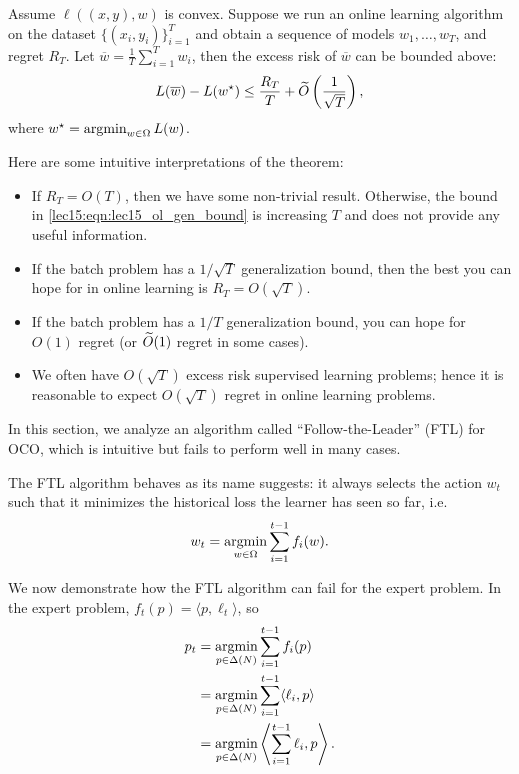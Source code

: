 \begin{theorem}
Assume $\ell((x, y), w)$ is convex. Suppose we run an online learning algorithm on the dataset $\{(x_i, y_i)\}_{i=1}^T$ and obtain a sequence of models $w_1, \dots, w_T$, and regret $R_T$. Let $\overline{w} = \frac{1}{T} \sum_{i=1}^T w_i$, then the excess risk of $\overline{w}$ can be bounded above:
\begin{align}
L(\overline{w}) - L(w^\star) \leq \frac{R_T}{T} + \widetilde{O}\left(\frac{1}{\sqrt{T}}\right), \label{lec15:eqn:lec15_ol_gen_bound}
\end{align}
where $w^\star = \operatorname*{\textup{argmin}}_{w \in \Omega} L(w)$.
\end{theorem}

Here are some intuitive interpretations of the theorem:

    \begin{itemize}
        \item If $R_T = O(T)$, then we have some non-trivial result. Otherwise, the bound in \eqref{lec15:eqn:lec15_ol_gen_bound} is increasing $T$ and does not provide any useful information.
        \item If the batch problem has a $1 / \sqrt{T}$ generalization bound, then the best you can hope for in online learning is $R_T = O(\sqrt{T})$.
        \item If the batch problem has a $1 / T$ generalization bound, you can hope for $O(1)$ regret (or $\widetilde{O}(1)$ regret in some cases).
        \item We often have $O(\sqrt{T})$ excess risk supervised learning problems; hence it is reasonable to expect $O(\sqrt{T})$ regret in online learning problems.
    \end{itemize}
    
 \label{lec15:sec:FTL}
In this section, we analyze an algorithm called ``Follow-the-Leader'' (FTL) for OCO, which is intuitive but fails to perform well in many cases.

The FTL algorithm behaves as its name suggests: it always selects the action $w_t$ such that it minimizes the historical loss the learner has seen so far, i.e.
\begin{equation}
w_t = \operatorname*{\textup{argmin}}_{w \in \Omega} \sum_{i=1}^{t-1} f_i(w).
\end{equation}

We now demonstrate how the FTL algorithm can fail for the expert problem. In the expert problem, $f_t(p) = \langle p, \ell_t \rangle$, so 
    \begin{align}
        p_t &= \operatorname*{\textup{argmin}}_{p \in \Delta(N)} \sum_{i=1}^{t-1} f_i(p) \\
        &= \operatorname*{\textup{argmin}}_{p \in \Delta(N)} \sum_{i=1}^{t-1} \langle\ell_i, p\rangle \\
        &= \operatorname*{\textup{argmin}}_{p \in \Delta(N)} \left\langle\sum_{i=1}^{t-1}\ell_i, p\right\rangle.
    \end{align}

